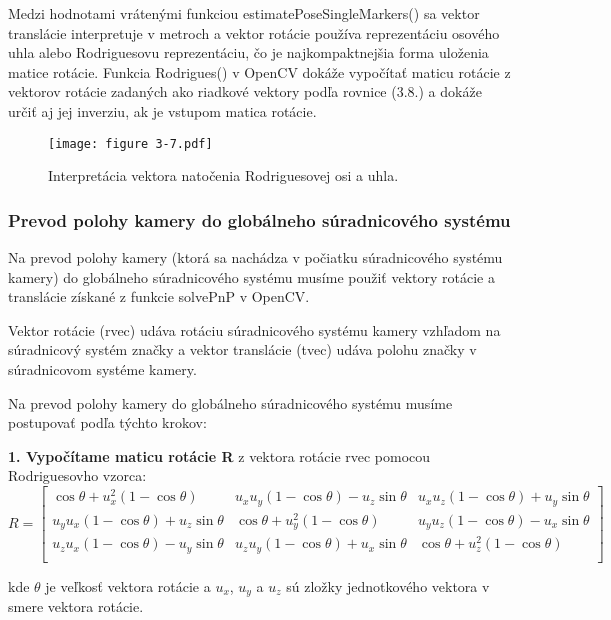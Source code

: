 {Medzi hodnotami vrátenými funkciou estimatePoseSingleMarkers() sa vektor translácie interpretuje v metroch a vektor rotácie používa reprezentáciu osového uhla alebo Rodriguesovu reprezentáciu, čo je najkompaktnejšia forma uloženia matice rotácie. Funkcia Rodrigues() v OpenCV dokáže vypočítať maticu rotácie z vektorov rotácie zadaných ako riadkové vektory podľa rovnice (3.8.) a dokáže určiť aj jej inverziu, ak je vstupom matica rotácie.
\begin{figure}[ht!]
    \centering
    \texttt{[image: figure 3-7.pdf]}
    \caption{Interpretácia vektora natočenia Rodriguesovej osi a uhla.}
    \label{o:3-7} 
\end{figure}

\subsubsection{Prevod polohy kamery do globálneho súradnicového systému}
Na prevod polohy kamery (ktorá sa nachádza v počiatku súradnicového systému kamery) do globálneho súradnicového systému musíme použiť vektory rotácie a translácie získané z funkcie solvePnP v OpenCV.

Vektor rotácie (rvec) udáva rotáciu súradnicového systému kamery vzhľadom na súradnicový systém značky a vektor translácie (tvec) udáva polohu značky v súradnicovom systéme kamery.

Na prevod polohy kamery do globálneho súradnicového systému musíme postupovať podľa týchto krokov:

\textbf{1. Vypočítame maticu rotácie R} z vektora rotácie rvec pomocou Rodriguesovho vzorca:
\begin{equation}
R = \begin{bmatrix}
\cos\theta + u_x^2(1-\cos\theta) & u_x u_y (1-\cos\theta) - u_z \sin\theta & u_x u_z (1-\cos\theta) + u_y \sin\theta \\
u_y u_x (1-\cos\theta) + u_z \sin\theta & \cos\theta + u_y^2(1-\cos\theta) & u_y u_z (1-\cos\theta) - u_x \sin\theta \\
u_z u_x (1-\cos\theta) - u_y \sin\theta & u_z u_y (1-\cos\theta) + u_x \sin\theta & \cos\theta + u_z^2(1-\cos\theta) \\
\end{bmatrix}
\end{equation}

kde $\theta$ je veľkosť vektora rotácie a $u_x$, $u_y$ a $u_z$ sú zložky jednotkového vektora v smere vektora rotácie.

}
